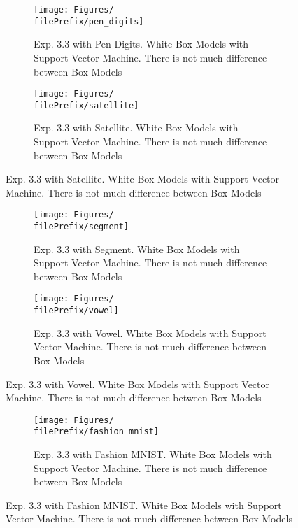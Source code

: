 \begin{figure}[ht]
  \centering
  \begin{subfigure}[t]{0.5\linewidth}
    \centering\captionsetup{width=.8\linewidth}\texttt{[image: Figures/\\filePrefix/pen\_digits]}
    \caption{Exp. 3.3 with Pen Digits. White Box Models with Support Vector Machine. There is not much difference between Box Models}
    \label{fig:\undPrefix_pen_digits}
  \end{subfigure}%
  \begin{subfigure}[t]{0.5\linewidth}
    \centering\captionsetup{width=.8\linewidth}\texttt{[image: Figures/\\filePrefix/satellite]}
    \caption{Exp. 3.3 with Satellite. White Box Models with Support Vector Machine. There is not much difference between Box Models}
    \label{fig:\undPrefix_satellite}
  \end{subfigure}
\end{figure}

\begin{figure}[ht]
  \centering
  \begin{subfigure}[t]{0.5\linewidth}
    \centering\captionsetup{width=.8\linewidth}\texttt{[image: Figures/\\filePrefix/segment]}
    \caption{Exp. 3.3 with Segment. White Box Models with Support Vector Machine. There is not much difference between Box Models}
    \label{fig:\undPrefix_segment}
  \end{subfigure}%
  \begin{subfigure}[t]{0.5\linewidth}
    \centering\captionsetup{width=.8\linewidth}\texttt{[image: Figures/\\filePrefix/vowel]}
    \caption{Exp. 3.3 with Vowel. White Box Models with Support Vector Machine. There is not much difference between Box Models}
    \label{fig:\undPrefix_vowel}
  \end{subfigure}
\end{figure}


\begin{figure}[ht]
  \centering
  \begin{subfigure}[t]{0.5\linewidth}
    \centering\captionsetup{width=.8\linewidth}\texttt{[image: Figures/\\filePrefix/fashion\_mnist]}
    \caption{Exp. 3.3 with Fashion MNIST. White Box Models with Support Vector Machine. There is not much difference between Box Models}
    \label{fig:\undPrefix_segment}
  \end{subfigure}%
\end{figure}


\let\major\undefined
\let\minor\undefined

\let\undPrefix\undefined
\let\dotPrefix\undefined
\let\scoPrefix\undefined

\let\filePrefix\undefined
